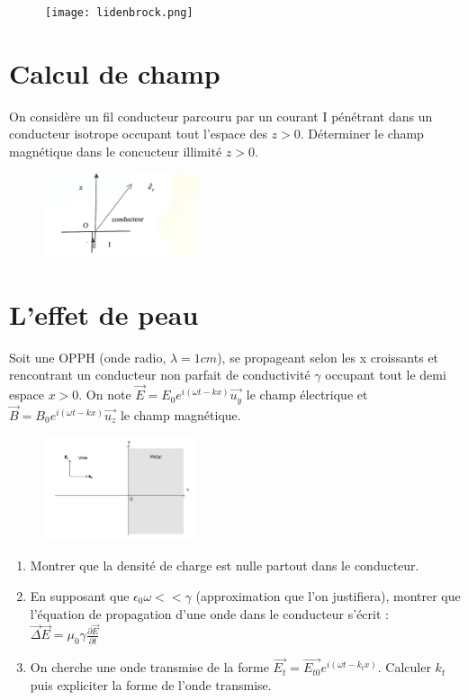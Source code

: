 \documentclass{article}
\begin{document}
\begin{figure}[h]
  \centering
  \texttt{[image: lidenbrock.png]}
  \label{fig:image1}
\end{figure}

\section{Calcul de champ}
On considère un fil conducteur parcouru par un courant I pénétrant dans un conducteur isotrope occupant tout l'espace des $z>0$. Déterminer le champ magnétique dans le concucteur illimité $z>0$. 
\begin{figure}[h]
  \centering
  \includegraphics[width=0.4\textwidth]{schéma_conducteur_isotrope.jpg}
  \label{fig:image1}
\end{figure}

\section{L'effet de peau}
 Soit une OPPH (onde radio, $\lambda=1 cm$), se propageant selon les x croissants et rencontrant un conducteur non parfait de conductivité $\gamma$ occupant tout le demi espace $x>0$.
On note $\vec{E} = E_0 e^{i(\omega t - k x)}\vec{u_y}$ le champ électrique et $\vec{B} = B_0 e^{i(\omega t - k x)}\vec{u_z}$ le champ magnétique. 
\begin{figure}[h]
  \centering
  \includegraphics[width=0.4\textwidth]{schéma.png}
  \label{fig:image1}
\end{figure}
\begin {enumerate} 

\item Montrer que la densité de charge est nulle partout dans le conducteur. 
\item En supposant que $\epsilon_0 \omega << \gamma$ (approximation que l'on justifiera), montrer que l'équation de propagation d'une onde dans le conducteur s'écrit : $\vec{\Delta} \vec{E} = \mu_0 \gamma \frac{\partial\vec{E}}{\partial t}\ $
\item On cherche une onde transmise de la forme $\vec{E_t}=\vec{E_{t0}} e^{i(\omega t - k_t x)}$. Calculer $k_t$ puis expliciter la forme de l'onde transmise.
\end {enumerate} 
\end{document}
